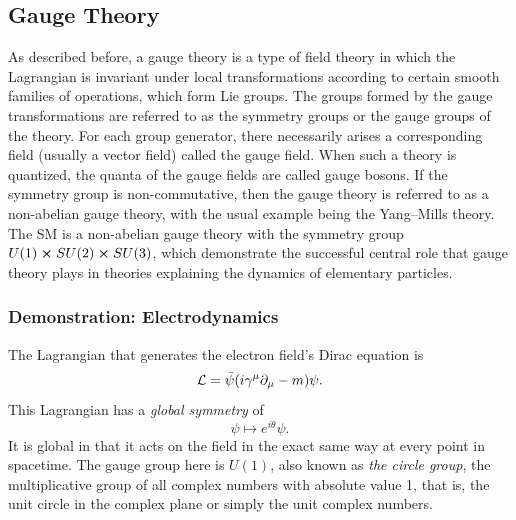\subsection{Gauge Theory}
\label{sec:gauge-theory}

As described before, a gauge theory is a type of field theory in which the Lagrangian is invariant under local transformations according to certain smooth families of operations, which form Lie groups. The groups formed by the gauge transformations are referred to as the symmetry groups or the gauge groups of the theory. For each group generator, there necessarily arises a corresponding field (usually a vector field) called the gauge field. When such a theory is quantized, the quanta of the gauge fields are called gauge bosons. If the symmetry group is non-commutative, then the gauge theory is referred to as a non-abelian gauge theory, with the usual example being the Yang–Mills theory. The SM is a non-abelian gauge theory with the symmetry group $U(1)\cross SU(2)\cross SU(3)$, which demonstrate the successful central role that gauge theory plays in theories explaining the dynamics of elementary particles.

\subsubsection{Demonstration: Electrodynamics}

The Lagrangian that generates the electron field's Dirac equation is
\begin{equation}
\mathcal{L}=\bar{\psi}\qty(i\gamma^{\mu}\partial_{\mu}-m)\psi.
\end{equation}
This Lagrangian has a \emph{global symmetry} of
\begin{equation}
\psi\mapsto e^{i\theta}\psi.
\end{equation}
It is global in that it acts on the field in the exact same way at every point in spacetime. The gauge group here is $U(1)$, also known as \emph{the circle group}, the multiplicative group of all complex numbers with absolute value 1, that is, the unit circle in the complex plane or simply the unit complex numbers.

